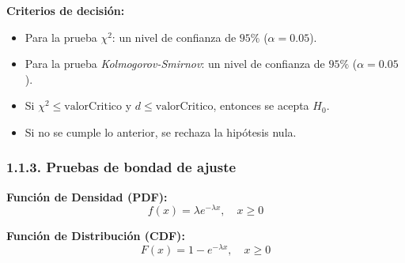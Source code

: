 \vspace{0.3cm}
\noindent \textbf{Criterios de decisión:}
\begin{itemize}
    \item Para la prueba \(\chi^2\): un nivel de confianza de \(95\%\) (\(\alpha = 0.05\)).
    \item Para la prueba \textit{Kolmogorov-Smirnov}: un nivel de confianza de \(95\%\) (\(\alpha = 0.05\)).
    \item Si \(\chi^2 \leq \text{valorCritico}\) y \(d \leq \text{valorCritico}\), entonces se acepta \(H_0\).
    \item Si no se cumple lo anterior, se rechaza la hipótesis nula.
\end{itemize}
\vspace{0.3cm}

\subsubsection*{1.1.3.\hspace{0.5em} Pruebas de bondad de ajuste}
\vspace{0.2cm}
\begin{minipage}{0.40\textwidth}
    \textbf{Función de Densidad (PDF):}
    \[
        f(x) = \lambda e^{-\lambda x}, \quad x \ge 0
    \]
\end{minipage}
\begin{minipage}{0.45\textwidth}
    \textbf{Función de Distribución (CDF):}
    \[
        F(x) = 1 - e^{-\lambda x}, \quad x \ge 0
    \]
\end{minipage}
\vspace{0.3cm}

